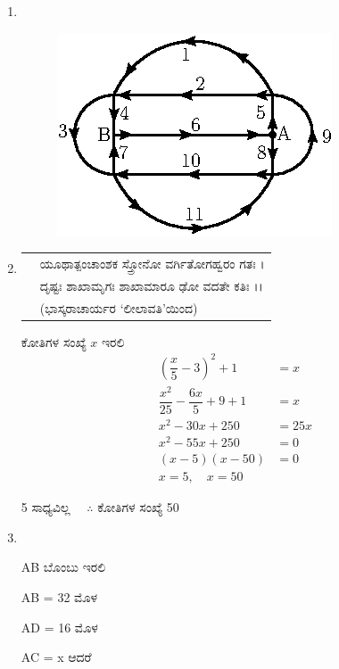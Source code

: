 \begin{enumerate}
\item
~

\begin{figure}[H]
\centering
\includegraphics[scale=1.1]{images/chap5/ans20.eps}

\end{figure}


\item
\begin{tabular}[t]{rl}
& ಯೂಥಾತ್ಪಂಚಾಂಶಕ ಸ್ತ್ರೋನೋ ವರ್ಗಿತೋಗಹ್ವರಂ ಗತಃ ।\\
& ದೃಷ್ಟಃ ಶಾಖಾಮೃಗಃ ಶಾಖಾಮಾರೂ ಢೋ ವದತೇ ಕತಿಃ ।। \\[0.1cm]
& \qquad \hfill{(ಭಾಸ್ಕರಾಚಾರ್ಯರ `ಲೀಲಾವತಿ'ಯಿಂದ)}
\end{tabular}

ಕೋತಿಗಳ ಸಂಖ್ಯೆ $x$ ಇರಲಿ
\begin{align*}
\left(\dfrac{x}{5} - 3 \right)^{2} + 1 & = x\\
\dfrac{x^{2}}{25} - \dfrac{6x}{5} + 9 + 1 & = x\\
x^{2} - 30x + 250 & = 25x\\
x^{2} - 55x + 250 & = 0\\
(x - 5)(x - 50) & = 0\\
x = 5,\quad x = 50 &
\end{align*}

5 ಸಾಧ್ಯವಿಲ್ಲ $\quad\therefore$ ಕೋತಿಗಳ ಸಂಖ್ಯೆ  50

\item
~

\begin{minipage}[c]{4cm}
AB ಬೊಂಬು ಇರಲಿ 

AB = 32 ಮೊಳ 

AD = 16 ಮೊಳ 

AC = x ಆದರೆ


\end{minipage}
\end{enumerate}
